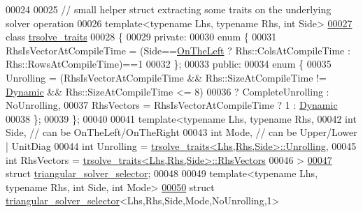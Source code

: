 \begin{DoxyCode}
00024 
00025 \textcolor{comment}{// small helper struct extracting some traits on the underlying solver operation}
00026 \textcolor{keyword}{template}<\textcolor{keyword}{typename} Lhs, \textcolor{keyword}{typename} Rhs, \textcolor{keywordtype}{int} S\textcolor{keywordtype}{id}e>
\hyperlink{class_eigen_1_1internal_1_1trsolve__traits}{00027} \textcolor{keyword}{class }\hyperlink{class_eigen_1_1internal_1_1trsolve__traits}{trsolve\_traits}
00028 \{
00029   \textcolor{keyword}{private}:
00030     \textcolor{keyword}{enum} \{
00031       RhsIsVectorAtCompileTime = (Side==\hyperlink{group__enums_ggac22de43beeac7a78b384f99bed5cee0ba129609b3bdf23b071f5f86cf2f995ec4}{OnTheLeft} ? Rhs::ColsAtCompileTime : 
      Rhs::RowsAtCompileTime)==1
00032     \};
00033   \textcolor{keyword}{public}:
00034     \textcolor{keyword}{enum} \{
00035       Unrolling   = (RhsIsVectorAtCompileTime && Rhs::SizeAtCompileTime != 
      \hyperlink{namespace_eigen_ad81fa7195215a0ce30017dfac309f0b2}{Dynamic} && Rhs::SizeAtCompileTime <= 8)
00036                   ? CompleteUnrolling : NoUnrolling,
00037       RhsVectors  = RhsIsVectorAtCompileTime ? 1 : \hyperlink{namespace_eigen_ad81fa7195215a0ce30017dfac309f0b2}{Dynamic}
00038     \};
00039 \};
00040 
00041 \textcolor{keyword}{template}<\textcolor{keyword}{typename} Lhs, \textcolor{keyword}{typename} Rhs,
00042   \textcolor{keywordtype}{int} Side, \textcolor{comment}{// can be OnTheLeft/OnTheRight}
00043   \textcolor{keywordtype}{int} Mode, \textcolor{comment}{// can be Upper/Lower | UnitDiag}
00044   \textcolor{keywordtype}{int} Unrolling = \hyperlink{class_eigen_1_1internal_1_1trsolve__traits}{trsolve\_traits<Lhs,Rhs,Side>::Unrolling},
00045   \textcolor{keywordtype}{int} RhsVectors = \hyperlink{class_eigen_1_1internal_1_1trsolve__traits}{trsolve\_traits<Lhs,Rhs,Side>::RhsVectors}
00046   >
\hyperlink{struct_eigen_1_1internal_1_1triangular__solver__selector}{00047} \textcolor{keyword}{struct }\hyperlink{struct_eigen_1_1internal_1_1triangular__solver__selector}{triangular\_solver\_selector};
00048 
00049 \textcolor{keyword}{template}<\textcolor{keyword}{typename} Lhs, \textcolor{keyword}{typename} Rhs, \textcolor{keywordtype}{int} S\textcolor{keywordtype}{id}e, \textcolor{keywordtype}{int} Mode>
\hyperlink{struct_eigen_1_1internal_1_1triangular__solver__selector_3_01_lhs_00_01_rhs_00_01_side_00_01_modf7016aec58372d55e43776676d69f5fb}{00050} \textcolor{keyword}{struct }\hyperlink{struct_eigen_1_1internal_1_1triangular__solver__selector}{triangular\_solver\_selector}<Lhs,Rhs,Side,Mode,NoUnrolling,1>

\end{DoxyCode}

